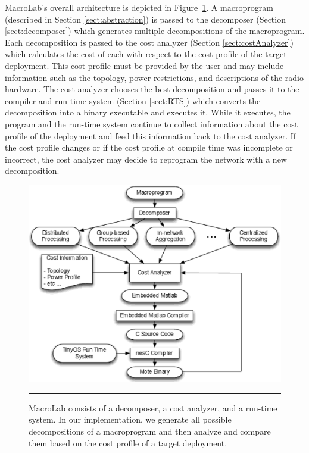 MacroLab's overall architecture is depicted in Figure~\ref{fig:System}. 
A macroprogram (described in Section \ref{sect:abstraction}) 
is passed to the decomposer (Section \ref{sect:decomposer}) which 
generates multiple decompositions of the macroprogram.
Each decomposition is passed to the cost analyzer (Section
\ref{sect:costAnalyzer}) which calculates the cost of each with respect to
the cost profile of the target deployment. This cost profile must be
provided by the user and may include information such as the topology,
power restrictions, and descriptions of the radio hardware. The cost
analyzer chooses the best decomposition and passes it to the compiler and run-time
system (Section \ref{sect:RTS}) which converts the decomposition into a binary
executable and executes it.  While it executes,
the program and the run-time system continue to collect information about
the cost profile of the deployment and feed this information back to the
cost analyzer.  If the cost profile changes or if the cost profile at
compile time was incomplete or incorrect, the cost analyzer may decide to
reprogram the network with a new decomposition.

\begin{figure}
  \centering
  \includegraphics[width=1\columnwidth]{fig/System.eps}
  \smallskip
  \hrule
  \caption[MacroLab system architecture]{MacroLab consists of a decomposer, a cost analyzer, and a run-time
    system. In our implementation, we generate all possible decompositions of a
    macroprogram and then analyze and compare them based on the cost profile of
    a target deployment.}
  \label{fig:System}
\end{figure}

